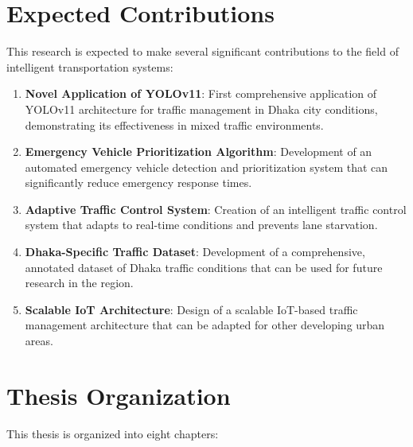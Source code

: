 \section{Expected Contributions}

This research is expected to make several significant contributions to the field of intelligent transportation systems:

\begin{enumerate}
    \item \textbf{Novel Application of YOLOv11}: First comprehensive application of YOLOv11 architecture for traffic management in Dhaka city conditions, demonstrating its effectiveness in mixed traffic environments.
    
    \item \textbf{Emergency Vehicle Prioritization Algorithm}: Development of an automated emergency vehicle detection and prioritization system that can significantly reduce emergency response times.
    
    \item \textbf{Adaptive Traffic Control System}: Creation of an intelligent traffic control system that adapts to real-time conditions and prevents lane starvation.
    
    \item \textbf{Dhaka-Specific Traffic Dataset}: Development of a comprehensive, annotated dataset of Dhaka traffic conditions that can be used for future research in the region.
    
    \item \textbf{Scalable IoT Architecture}: Design of a scalable IoT-based traffic management architecture that can be adapted for other developing urban areas.
\end{enumerate}

\section{Thesis Organization}

This thesis is organized into eight chapters:

